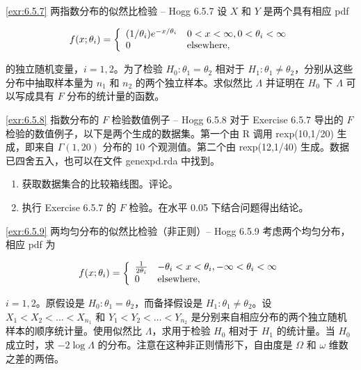 \begin{exercise}{\ref{exr:6.5.7} 两指数分布的似然比检验 – Hogg 6.5.7}\label{exr:6.5.7}
设 $X$ 和 $Y$ 是两个具有相应 pdf

\[
f(x;\theta_i) = \left\{ \begin{array}{l l}
(1/\theta_i)e^{-x/\theta_i} & 0 < x < \infty, 0 < \theta_i < \infty \\
0 & \text{elsewhere},
\end{array} \right.
\]

的独立随机变量，$i=1,2$。为了检验 $H_0: \theta_1 = \theta_2$ 相对于 $H_1: \theta_1 \neq \theta_2$，分别从这些分布中抽取样本量为 $n_1$ 和 $n_2$ 的两个独立样本。求似然比 $\Lambda$ 并证明在 $H_0$ 下 $\Lambda$ 可以写成具有 $F$ 分布的统计量的函数。
\end{exercise}

\begin{exercise}{\ref{exr:6.5.8} 指数分布的 $F$ 检验数值例子 – Hogg 6.5.8}\label{exr:6.5.8}
对于 Exercise 6.5.7 导出的 $F$ 检验的数值例子，以下是两个生成的数据集。第一个由 R 调用 rexp(10,1/20) 生成，即来自 $\Gamma(1,20)$ 分布的 10 个观测值。第二个由 rexp(12,1/40) 生成。数据已四舍五入，也可以在文件 genexpd.rda 中找到。

\begin{enumerate}
\item[(a)] 获取数据集合的比较箱线图。评论。
\item[(b)] 执行 Exercise 6.5.7 的 $F$ 检验。在水平 0.05 下结合问题得出结论。
\end{enumerate}
\end{exercise}

\begin{exercise}{\ref{exr:6.5.9} 两均匀分布的似然比检验（非正则）– Hogg 6.5.9}\label{exr:6.5.9}
考虑两个均匀分布，相应 pdf 为

\[
f(x;\theta_i) = \left\{ \begin{array}{l l}
\frac{1}{2\theta_i} & -\theta_i < x < \theta_i, -\infty < \theta_i < \infty \\
0 & \text{elsewhere},
\end{array} \right.
\]

$i=1,2$。原假设是 $H_0: \theta_1 = \theta_2$，而备择假设是 $H_1: \theta_1 \neq \theta_2$。设 $X_1 < X_2 < \ldots < X_{n_1}$ 和 $Y_1 < Y_2 < \ldots < Y_{n_2}$ 是分别来自相应分布的两个独立随机样本的顺序统计量。使用似然比 $\Lambda$，求用于检验 $H_0$ 相对于 $H_1$ 的统计量。当 $H_0$ 成立时，求 $-2\log\Lambda$ 的分布。注意在这种非正则情形下，自由度是 $\Omega$ 和 $\omega$ 维数之差的两倍。
\end{exercise}

